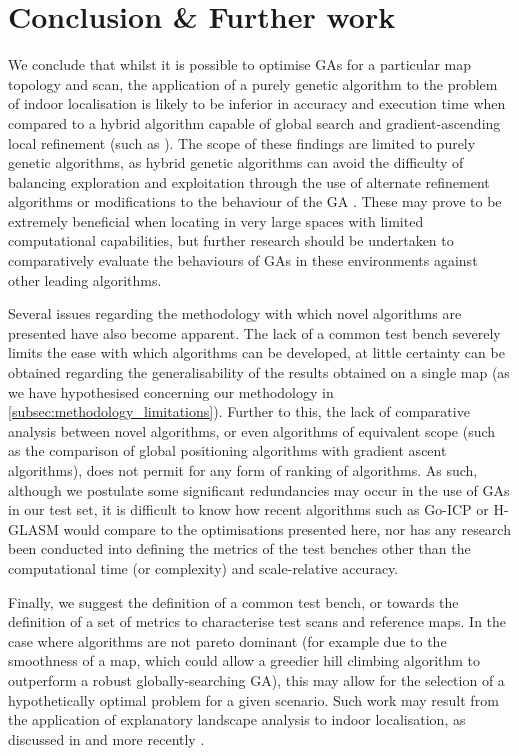 \documentclass[authoryearcitations]{UoYCSproject}
\begin{document}
\section{Conclusion \& Further work}
\label{sec:conclusion}
We conclude that whilst it is possible to optimise GAs for a particular map topology and scan, the application of a purely genetic algorithm to the problem of indoor localisation is likely to be inferior in accuracy and execution time when compared to a hybrid algorithm capable of global search and gradient-ascending local refinement (such as \cite{Yang2013-gx}). The scope of these findings are limited to purely genetic algorithms, as hybrid genetic algorithms can avoid the difficulty of balancing exploration and exploitation through the use of alternate refinement algorithms \cite{Lenac2011-co} or modifications to the behaviour of the GA \cite{Chow2004-xc}. These may prove to be extremely beneficial when locating in very large spaces with limited computational capabilities, but further research should be undertaken to comparatively evaluate the behaviours of GAs in these environments against other leading algorithms.\newline

Several issues regarding the methodology with which novel algorithms are presented have also become apparent. The lack of a common test bench severely limits the ease with which algorithms can be developed, at little certainty can be obtained regarding the generalisability of the results obtained on a single map (as we have hypothesised concerning our methodology in \autoref{subsec:methodology_limitations}). Further to this, the lack of comparative analysis between novel algorithms, or even algorithms of equivalent scope (such as the comparison of global positioning algorithms with gradient ascent algorithms), does not permit for any form of ranking of algorithms. As such, although we postulate some significant redundancies may occur in the use of GAs in our test set, it is difficult to know how recent algorithms such as Go-ICP \cite{Yang2013-gx} or H-GLASM \cite{Lenac2011-co} would compare to the optimisations presented here, nor has any research been conducted into defining the metrics of the test benches other than the computational time (or complexity) and scale-relative accuracy. \newline

Finally, we suggest the definition of a common test bench, or towards the definition of a set of metrics to characterise test scans and reference maps. In the case where algorithms are not pareto dominant (for example due to the smoothness of a map, which could allow a greedier hill climbing algorithm to outperform a robust globally-searching GA), this may allow for the selection of a hypothetically optimal problem for a given scenario. Such work may result from the application of explanatory landscape analysis to indoor localisation, as discussed in \citet{Mitchell1992-fl} and more recently \citet{Mersmann2011-jm}. \newline
\end{document}
